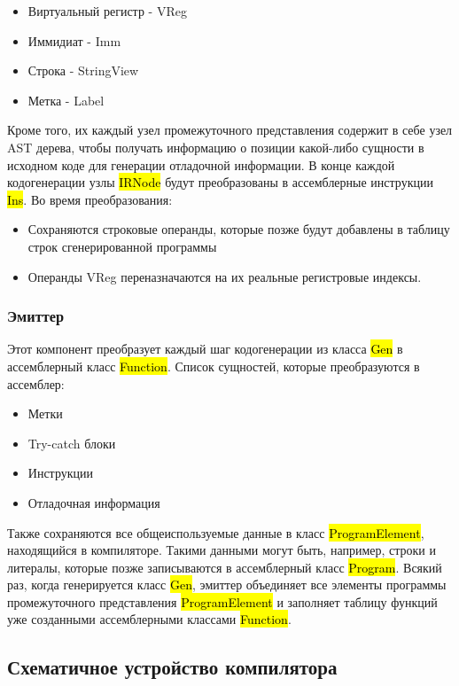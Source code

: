 \begin{itemize}[left=2em]
    \item Виртуальный регистр - VReg
    \item Иммидиат - Imm
    \item Строка - StringView
    \item Метка - Label
\end{itemize}

Кроме того, их каждый узел промежуточного представления содержит в себе узел AST дерева,
чтобы получать информацию о позиции какой-либо сущности в исходном коде для генерации отладочной информации.
В конце каждой кодогенерации узлы \hl{IRNode} будут преобразованы в ассемблерные инструкции \hl{Ins}.
Во время преобразования:

\begin{itemize}[left=2em]
    \item Сохраняются строковые операнды, которые позже будут добавлены в таблицу строк сгенерированной программы
    \item Операнды VReg переназначаются на их реальные регистровые индексы.
\end{itemize}

\subsubsection{Эмиттер}

Этот компонент преобразует каждый шаг кодогенерации из класса \hl{Gen} в ассемблерный класс \hl{Function}.
Список сущностей, которые преобразуются в ассемблер:

\begin{itemize}[left=2em]
    \item Метки
    \item Try-catch блоки
    \item Инструкции
    \item Отладочная информация
\end{itemize}

Также сохраняются все общеиспользуемые данные в класс \hl{ProgramElement}, находящийся в компиляторе.
Такими данными могут быть, например, строки и литералы, которые позже записываются в ассемблерный класс \hl{Program}.
Всякий раз, когда генерируется класс \hl{Gen}, эмиттер объединяет все элементы программы промежуточного представления
\hl{ProgramElement} и заполняет таблицу функций уже созданными ассемблерными классами \hl{Function}.

\subsection{Схематичное устройство компилятора}

